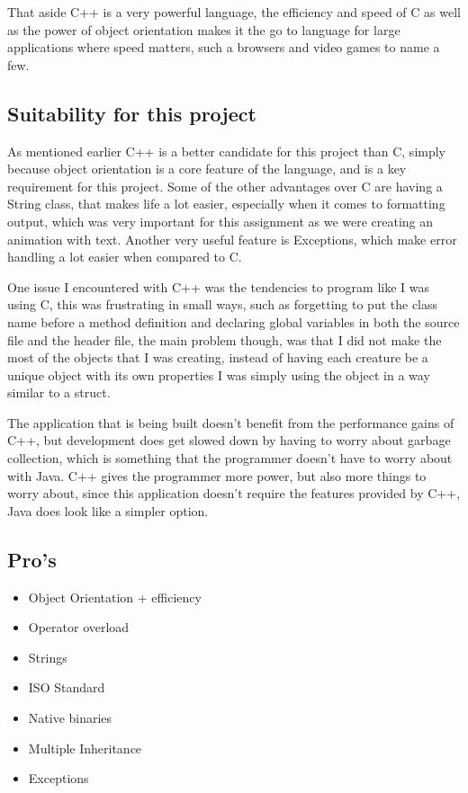 \documentclass[10pt]{article}
\begin{document}
  That aside C++ is a very powerful language, the efficiency and speed of C as well as the power of object orientation makes it the go to language for large applications where speed matters, such a browsers and video games to name a few. 

  \subsection{Suitability for this project}
  As mentioned earlier C++ is a better candidate for this project than C, simply because object orientation is a core feature of the language, and is a key requirement for this project. Some of the other advantages over C are having a String class, that makes life a lot easier, especially when it comes to formatting output, which was very important for this assignment as we were creating an animation with text. Another very useful feature is Exceptions, which make error handling a lot easier when compared to C.
  
  One issue I encountered with C++ was the tendencies to program like I was using C, this was frustrating in small ways, such as forgetting to put the class name before a method definition and declaring global variables in both the source file and the header file, the main problem though, was that I did not make the most of the objects that I was creating, instead of having each creature be a unique object with its own properties I was simply using the object in a way similar to a struct. 
  
  The application that is being built doesn't benefit from the performance gains of C++, but development does get slowed down by having to worry about garbage collection, which is something that the programmer doesn't have to worry about with Java. C++ gives the programmer more power, but also more things to worry about, since this application doesn't require the features provided by C++, Java does look like a simpler option. 

  \subsection{Pro's}
  \begin{itemize}
    \item Object Orientation + efficiency 
    \item Operator overload
    \item Strings
    \item ISO Standard
    \item Native binaries
    \item Multiple Inheritance
    \item Exceptions
  \end{itemize}
\end{document}
